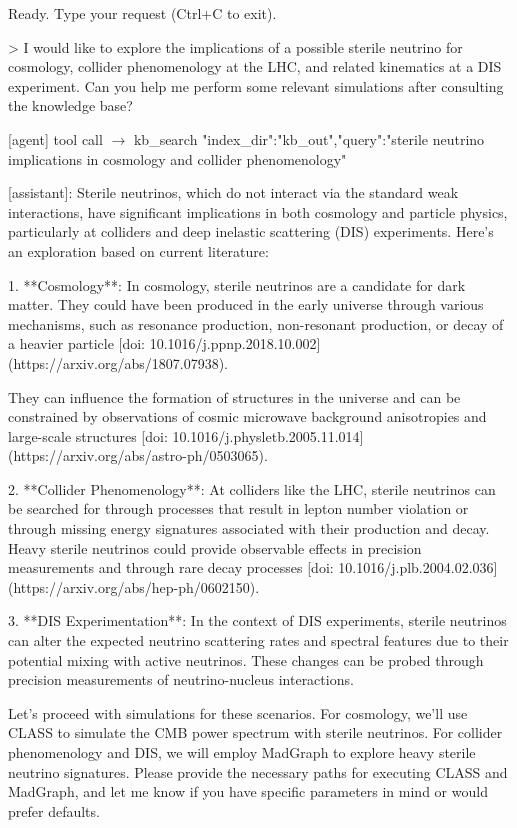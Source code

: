 \documentclass[final,3p,times,sort,compress]{elsarticle}
\begin{document}
\begin{terminalbox}
\begin{terminal}
[ArgoLOOM] Ready. Type your request (Ctrl+C to exit).

> I would like to explore the implications of a possible sterile neutrino for cosmology, collider phenomenology at the LHC, and related kinematics at a DIS experiment. Can you help me perform some relevant simulations after consulting the knowledge base?

[agent] tool call $\to$ kb\_search {"index\_dir":"kb\_out","query":"sterile neutrino implications in cosmology and collider phenomenology"}

[assistant]: Sterile neutrinos, which do not interact via the standard weak interactions, have significant implications in both cosmology and particle physics, particularly at colliders and deep inelastic scattering (DIS) experiments. Here's an exploration based on current literature:

1. **Cosmology**:  
In cosmology, sterile neutrinos are a candidate for dark matter. They could have been produced in the early universe through various mechanisms, such as resonance production, non-resonant production, or decay of a heavier particle [doi: 10.1016/j.ppnp.2018.10.002](https://arxiv.org/abs/1807.07938).

They can influence the formation of structures in the universe and can be constrained by observations of cosmic microwave background anisotropies and large-scale structures [doi: 10.1016/j.physletb.2005.11.014](https://arxiv.org/abs/astro-ph/0503065).

2. **Collider Phenomenology**:  
At colliders like the LHC, sterile neutrinos can be searched for through processes that result in lepton number violation or through missing energy signatures associated with their production and decay. Heavy sterile neutrinos could provide observable effects in precision measurements and through rare decay processes [doi: 10.1016/j.plb.2004.02.036](https://arxiv.org/abs/hep-ph/0602150).

3. **DIS Experimentation**:  
In the context of DIS experiments, sterile neutrinos can alter the expected neutrino scattering rates and spectral features due to their potential mixing with active neutrinos. These changes can be probed through precision measurements of neutrino-nucleus interactions.

Let's proceed with simulations for these scenarios. For cosmology, we'll use CLASS to simulate the CMB power spectrum with sterile neutrinos. For collider phenomenology and DIS, we will employ MadGraph to explore heavy sterile neutrino signatures. Please provide the necessary paths for executing CLASS and MadGraph, and let me know if you have specific parameters in mind or would prefer defaults.
\end{terminal}
\end{terminalbox}
%
%
\end{document}
